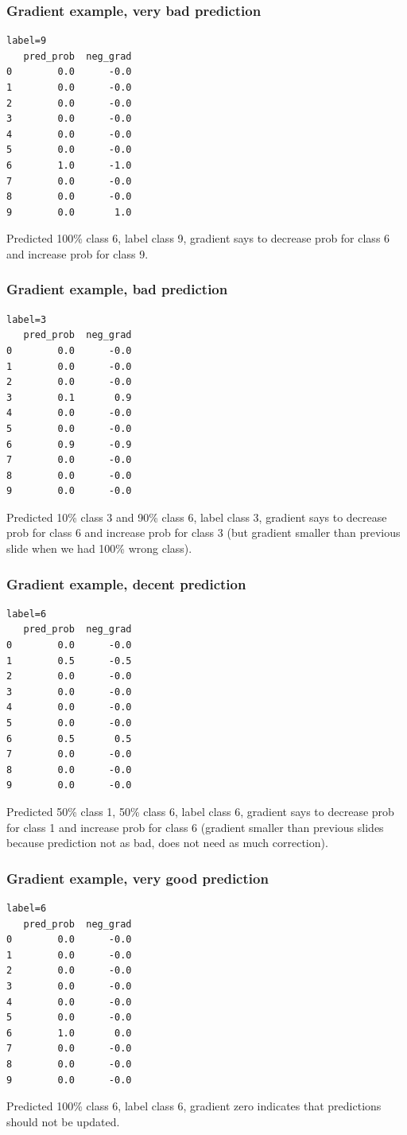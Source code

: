 \documentclass{beamer}
\begin{document}
\begin{frame}[fragile]
  \frametitle{Gradient example, very bad prediction}
\begin{verbatim}
label=9
   pred_prob  neg_grad
0        0.0      -0.0
1        0.0      -0.0
2        0.0      -0.0
3        0.0      -0.0
4        0.0      -0.0
5        0.0      -0.0
6        1.0      -1.0
7        0.0      -0.0
8        0.0      -0.0
9        0.0       1.0
\end{verbatim}
  Predicted 100\% class 6, label class 9, gradient says to decrease prob for
  class 6 and increase prob for class 9.
\end{frame}

\begin{frame}[fragile]
  \frametitle{Gradient example, bad prediction}
\begin{verbatim}
label=3
   pred_prob  neg_grad
0        0.0      -0.0
1        0.0      -0.0
2        0.0      -0.0
3        0.1       0.9
4        0.0      -0.0
5        0.0      -0.0
6        0.9      -0.9
7        0.0      -0.0
8        0.0      -0.0
9        0.0      -0.0
\end{verbatim}
  Predicted 10\% class 3 and 90\% class 6, label class 3, gradient
  says to decrease prob for class 6 and increase prob for class 3 (but
  gradient smaller than previous slide when we had 100\% wrong class).
\end{frame}

\begin{frame}[fragile]
  \frametitle{Gradient example, decent prediction}
\begin{verbatim}
label=6
   pred_prob  neg_grad
0        0.0      -0.0
1        0.5      -0.5
2        0.0      -0.0
3        0.0      -0.0
4        0.0      -0.0
5        0.0      -0.0
6        0.5       0.5
7        0.0      -0.0
8        0.0      -0.0
9        0.0      -0.0
\end{verbatim}
  Predicted 50\% class 1, 50\% class 6, label class 6, gradient says to
  decrease prob for class 1 and increase prob for class 6 (gradient
  smaller than previous slides because prediction not as bad, does not
  need as much correction).
\end{frame}

\begin{frame}[fragile]
  \frametitle{Gradient example, very good prediction}
\begin{verbatim}
label=6
   pred_prob  neg_grad
0        0.0      -0.0
1        0.0      -0.0
2        0.0      -0.0
3        0.0      -0.0
4        0.0      -0.0
5        0.0      -0.0
6        1.0       0.0
7        0.0      -0.0
8        0.0      -0.0
9        0.0      -0.0
\end{verbatim}
  Predicted 100\% class 6, label class 6, gradient zero indicates that
  predictions should not be updated.
\end{frame}
\end{document}
